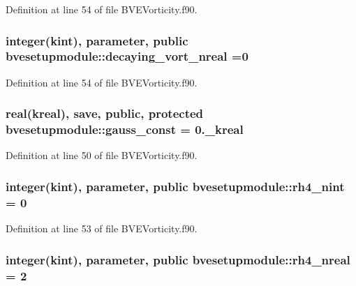 Definition at line 54 of file B\+V\+E\+Vorticity.\+f90.

\hypertarget{classbvesetupmodule_a515b33c3a7c090f07e283e4c8bbd734d}{
\subsubsection[{decaying\+\_\+vort\+\_\+nreal}]{\setlength{\rightskip}{0pt plus 5cm}integer(kint), parameter, public bvesetupmodule\+::decaying\+\_\+vort\+\_\+nreal =0}}\label{classbvesetupmodule_a515b33c3a7c090f07e283e4c8bbd734d}


Definition at line 54 of file B\+V\+E\+Vorticity.\+f90.

\hypertarget{classbvesetupmodule_adc6dbe555dff44ec956fb6679b8a19d8}{
\subsubsection[{gauss\+\_\+const}]{\setlength{\rightskip}{0pt plus 5cm}real(kreal), save, public, protected bvesetupmodule\+::gauss\+\_\+const = 0.\+\_\+kreal}}\label{classbvesetupmodule_adc6dbe555dff44ec956fb6679b8a19d8}


Definition at line 50 of file B\+V\+E\+Vorticity.\+f90.

\hypertarget{classbvesetupmodule_a1e43a3192e12983928ccbf1a38e5e544}{
\subsubsection[{rh4\+\_\+nint}]{\setlength{\rightskip}{0pt plus 5cm}integer(kint), parameter, public bvesetupmodule\+::rh4\+\_\+nint = 0}}\label{classbvesetupmodule_a1e43a3192e12983928ccbf1a38e5e544}


Definition at line 53 of file B\+V\+E\+Vorticity.\+f90.

\hypertarget{classbvesetupmodule_afed13cb11c0291a7baf6d44bd0c74249}{
\subsubsection[{rh4\+\_\+nreal}]{\setlength{\rightskip}{0pt plus 5cm}integer(kint), parameter, public bvesetupmodule\+::rh4\+\_\+nreal = 2}}\label{classbvesetupmodule_afed13cb11c0291a7baf6d44bd0c74249}


